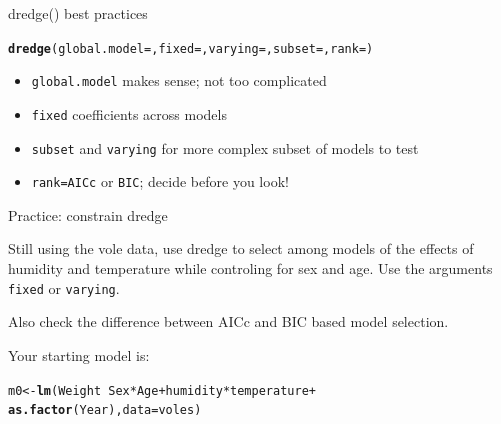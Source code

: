 \documentclass[12pt]{beamer}\usepackage[]{graphicx}\usepackage[]{color}
\makeatletter
\newcommand{\hlopt}[1]{\textcolor[rgb]{0,0,0}{#1}}%
\newcommand{\hlstd}[1]{\textcolor[rgb]{0.345,0.345,0.345}{#1}}%
\newcommand{\hlkwb}[1]{\textcolor[rgb]{0.69,0.353,0.396}{#1}}%
\newcommand{\hlkwc}[1]{\textcolor[rgb]{0.333,0.667,0.333}{#1}}%
\newcommand{\hlkwd}[1]{\textcolor[rgb]{0.737,0.353,0.396}{\textbf{#1}}}%
\newenvironment{kframe}{%
 \def\at@end@of@kframe{}%
 \ifinner\ifhmode%
  \def\at@end@of@kframe{\end{minipage}}%
  \begin{minipage}{\columnwidth}%
 \fi\fi%
 \def\FrameCommand##1{\hskip\@totalleftmargin \hskip-\fboxsep
 \colorbox{shadecolor}{##1}\hskip-\fboxsep
     \hskip-\linewidth \hskip-\@totalleftmargin \hskip\columnwidth}%
 \MakeFramed {\advance\hsize-\width
   \@totalleftmargin\z@ \linewidth\hsize
   \@setminipage}}%
 {\par\unskip\endMakeFramed%
 \at@end@of@kframe}
\newenvironment{knitrout}{}{} %
\makeatother
\begin{document}
\begin{frame}{dredge() best practices}

\begin{knitrout}\small
{}\color{fgcolor}\begin{kframe}
\begin{alltt}
\hlkwd{dredge}\hlstd{(}\hlkwc{global.model}\hlstd{= ,}\hlkwc{fixed} \hlstd{= ,}\hlkwc{varying}\hlstd{= ,}\hlkwc{subset}\hlstd{= ,}\hlkwc{rank}\hlstd{=)}
\end{alltt}
\end{kframe}
\end{knitrout}

\begin{itemize}[<+->]
  \item \texttt{global.model} makes sense; not too complicated
  \item \texttt{fixed} coefficients across models
  \item \texttt{subset} and \texttt{varying} for more complex subset of models to test
  \item \texttt{rank=AICc} or \texttt{BIC}; decide before you look!
\end{itemize}

\end{frame}


\begin{frame}[fragile]{Practice: constrain dredge}

Still using the vole data, use dredge to select among models of the effects of humidity and temperature while controling for sex and age. Use the arguments \texttt{fixed} or \texttt{varying}. 

Also check the difference between AICc and BIC based model selection.

Your starting model is:
\begin{knitrout}\small
{}\color{fgcolor}\begin{kframe}
\begin{alltt}
\hlstd{m0} \hlkwb{<-} \hlkwd{lm}\hlstd{(Weight} \hlopt{~} \hlstd{Sex}\hlopt{*}\hlstd{Age} \hlopt{+} \hlstd{humidity}\hlopt{*}\hlstd{temperature} \hlopt{+}
           \hlkwd{as.factor}\hlstd{(Year) ,} \hlkwc{data} \hlstd{= voles)}
\end{alltt}
\end{kframe}
\end{knitrout}



\end{frame}
\end{document}
